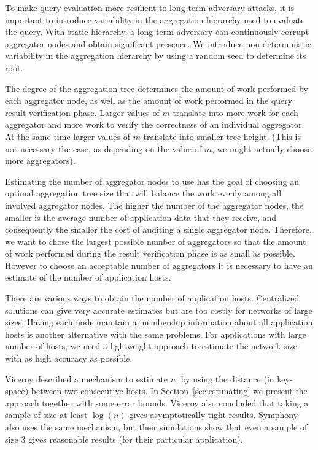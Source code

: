 \documentclass[11pt,twocolumn]{MyTightStyle}
\theoremstyle{plain}
\theoremstyle{definition}
\theoremstyle{remark}
\numberwithin{equation}{section}
\begin{document}
To make query evaluation more resilient to long-term adversary attacks,
it is important to introduce variability in the aggregation hierarchy
used to evaluate the query. With static hierarchy, a long term
adversary can continuously corrupt aggregator nodes and obtain
significant presence. We introduce non-deterministic variability in
the aggregation hierarchy by using a random seed to determine its
root. 

The degree of the aggregation tree determines the amount of work
performed by each aggregator node, as well as the amount of work
performed in the query result verification phase. Larger values of $m$
translate into more work for each aggregator and more work to verify
the correctness of an individual aggregator. At the same time larger
values of $m$ translate into smaller tree height. (This is not
necessary the case, as depending on the value of $m$, we might
actually choose more aggregators).

Estimating the number of aggregator nodes to use has the goal of
choosing an optimal aggregation tree size that will balance the work
evenly among all involved aggregator nodes. The higher the number of
the aggregator nodes, the smaller is the average number of application
data that they receive, and consequently the smaller the cost of
auditing a single aggregator node. Therefore, we want to chose the
largest possible number of aggregators so that the 
amount of work performed during the result verification phase is as small
as possible. However to choose an acceptable number of aggregators it
is necessary to have an estimate of the number of application hosts. 

There are various ways to obtain the number of application
hosts. Centralized solutions can give very accurate estimates but are
too costly for networks of large sizes. Having each node maintain a
membership information about all application hosts is another
alternative with the same problems. For applications with large number
of hosts, we need a lightweight approach to estimate the network size
with as high accuracy as possible. 

Viceroy described a mechanism to estimate $n$, by using the distance
(in key-space) between two consecutive hosts. In
Section~\ref{sec:estimating} we present the approach together with
some error bounds. Viceroy also concluded that taking a sample of size
at least $\log(n)$ gives asymptotically tight results. Symphony also
uses the same mechanism, but their simulations show that even a sample
of size 3 gives reasonable results (for their particular application).
\end{document}
